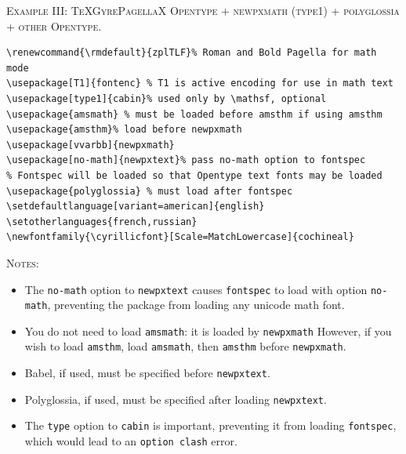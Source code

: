 \documentclass[11pt]{article}
\theoremstyle{oldplain}
\theoremstyle{plain}
\begin{document}
\textsc{Example III: TeXGyrePagellaX Opentype + newpxmath (type1) + polyglossia + other Opentype.}
\begin{verbatim}
\renewcommand{\rmdefault}{zplTLF}% Roman and Bold Pagella for math mode
\usepackage[T1]{fontenc} % T1 is active encoding for use in math text
\usepackage[type1]{cabin}% used only by \mathsf, optional
\usepackage{amsmath} % must be loaded before amsthm if using amsthm
\usepackage{amsthm}% load before newpxmath
\usepackage[vvarbb]{newpxmath}
\usepackage[no-math]{newpxtext}% pass no-math option to fontspec
% Fontspec will be loaded so that Opentype text fonts may be loaded
\usepackage{polyglossia} % must load after fontspec
\setdefaultlanguage[variant=american]{english}
\setotherlanguages{french,russian}
\newfontfamily{\cyrillicfont}[Scale=MatchLowercase]{cochineal}
\end{verbatim}
\textsc{Notes:}
\begin{itemize}
\item The {\tt no-math} option to {\tt newpxtext} causes {\tt fontspec} to load with option {\tt no-math}, preventing the package from loading any unicode math font.
\item
You do not need to load {\tt amsmath}: it is loaded by {\tt newpxmath} However, if you wish to load {\tt amsthm}, load {\tt amsmath}, then {\tt amsthm} before {\tt newpxmath}.
\item Babel, if used, must be specified before {\tt newpxtext}.
\item Polyglossia, if used, must be specified after loading {\tt newpxtext}.
\item The {\tt type} option to {\tt cabin} is important, preventing it from loading {\tt fontspec}, which would lead to an {\tt option clash} error. 
\end{itemize}
\end{document}
